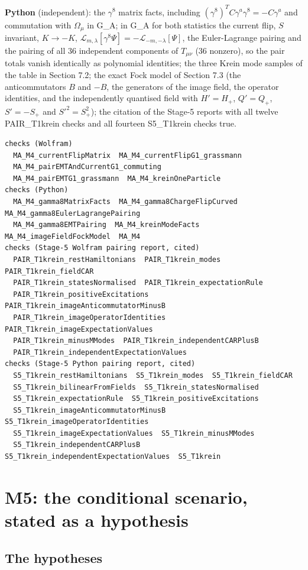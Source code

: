\documentclass[11pt]{article}
\begin{document}
\textbf{Python} (independent): the $\gamma^8$ matrix facts, including $(\gamma^8)^TC\gamma^a\gamma^8=-C\gamma^a$ and commutation with $\Omega_\mu$ in G\_A; in G\_A for both statistics the current flip, $S$ invariant, $K\to-K$, $\mathcal L_{m,\lambda}[\gamma^8\Psi]=-\mathcal L_{-m,-\lambda}[\Psi]$, the Euler-Lagrange pairing and the pairing of all 36 independent components of $T_{\mu\nu}$ (36 nonzero), so the pair totals vanish identically as polynomial identities; the three Krein mode samples of the table in Section 7.2; the exact Fock model of Section 7.3 (the anticommutators $B$ and $-B$, the generators of the image field, the operator identities, and the independently quantised field with $H'=H_+$, $Q'=Q_+$, $S'=-S_+$ and $S'^2=S_+^2$); the citation of the Stage-5 reports with all twelve PAIR\_T1krein checks and all fourteen S5\_T1krein checks true.

\begin{Verbatim}[fontsize=\small]
checks (Wolfram)
  MA_M4_currentFlipMatrix  MA_M4_currentFlipG1_grassmann
  MA_M4_pairEMTAndCurrentG1_commuting
  MA_M4_pairEMTG1_grassmann  MA_M4_kreinOneParticle
checks (Python)
  MA_M4_gamma8MatrixFacts  MA_M4_gamma8ChargeFlipCurved  MA_M4_gamma8EulerLagrangePairing
  MA_M4_gamma8EMTPairing  MA_M4_kreinModeFacts  MA_M4_imageFieldFockModel  MA_M4
checks (Stage-5 Wolfram pairing report, cited)
  PAIR_T1krein_restHamiltonians  PAIR_T1krein_modes  PAIR_T1krein_fieldCAR
  PAIR_T1krein_statesNormalised  PAIR_T1krein_expectationRule
  PAIR_T1krein_positiveExcitations  PAIR_T1krein_imageAnticommutatorMinusB
  PAIR_T1krein_imageOperatorIdentities  PAIR_T1krein_imageExpectationValues
  PAIR_T1krein_minusMModes  PAIR_T1krein_independentCARPlusB
  PAIR_T1krein_independentExpectationValues
checks (Stage-5 Python pairing report, cited)
  S5_T1krein_restHamiltonians  S5_T1krein_modes  S5_T1krein_fieldCAR
  S5_T1krein_bilinearFromFields  S5_T1krein_statesNormalised
  S5_T1krein_expectationRule  S5_T1krein_positiveExcitations
  S5_T1krein_imageAnticommutatorMinusB  S5_T1krein_imageOperatorIdentities
  S5_T1krein_imageExpectationValues  S5_T1krein_minusMModes
  S5_T1krein_independentCARPlusB  S5_T1krein_independentExpectationValues  S5_T1krein
\end{Verbatim}

\section{M5: the conditional scenario, stated as a hypothesis}

\subsection{The hypotheses}
\end{document}
